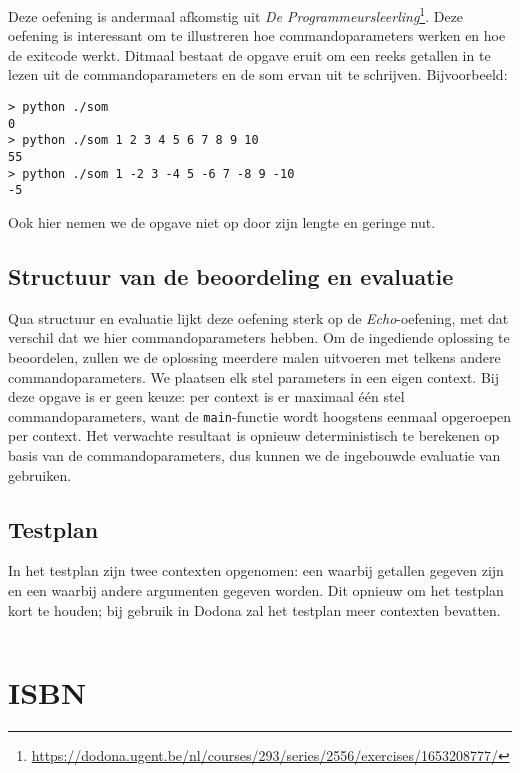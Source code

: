 Deze oefening is andermaal afkomstig uit \emph{De Programmeursleerling}\footnote{\url{https://dodona.ugent.be/nl/courses/293/series/2556/exercises/1653208777/}}.
Deze oefening is interessant om te illustreren hoe commandoparameters werken en hoe de exitcode werkt.
Ditmaal bestaat de opgave eruit om een reeks getallen in te lezen uit de commandoparameters en de som ervan uit te schrijven.
Bijvoorbeeld:

\begin{verbatim}
> python ./som
0
> python ./som 1 2 3 4 5 6 7 8 9 10
55
> python ./som 1 -2 3 -4 5 -6 7 -8 9 -10
-5
\end{verbatim}

Ook hier nemen we de opgave niet op door zijn lengte en geringe nut.

\subsection{Structuur van de beoordeling en evaluatie}\label{subsec:oefening-som-structuur}

Qua structuur en evaluatie lijkt deze oefening sterk op de \emph{Echo}-oefening, met dat verschil dat we hier commandoparameters hebben.
Om de ingediende oplossing te beoordelen, zullen we de oplossing meerdere malen uitvoeren met telkens andere commandoparameters.
We plaatsen elk stel parameters in een eigen context.
Bij deze opgave is er geen keuze: per context is er maximaal één stel commandoparameters, want de \texttt{main}-functie wordt hoogstens eenmaal opgeroepen per context.
Het verwachte resultaat is opnieuw deterministisch te berekenen op basis van de commandoparameters, dus kunnen we de ingebouwde evaluatie van \tested{} gebruiken.

\subsection{Testplan}\label{subsec:oefening-som-testplan}

In het testplan zijn twee contexten opgenomen: een waarbij getallen gegeven zijn en een waarbij andere argumenten gegeven worden.
Dit opnieuw om het testplan kort te houden;
bij gebruik in Dodona zal het testplan meer contexten bevatten.

\inputminted{json}{sources/sum-plan.tson}

\section{ISBN}\label{sec:oefening-isbn}

